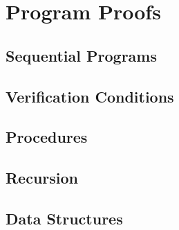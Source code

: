 \documentclass[12pt, a4paper]{book}
\begin{document}

  \chapter{Program Proofs}
  \label{chap:Program Proofs}

  \section{Sequential Programs}
  \label{sec:Sequential Programs}

  \section{Verification Conditions}
  \label{sec:Verification Conditions}
  \section{Procedures}
  \label{sec:Procedures}

  \section{Recursion}
  \label{sec:Recursion}

  \section{Data Structures}
  \label{sec:Data Structures}
\end{document}
